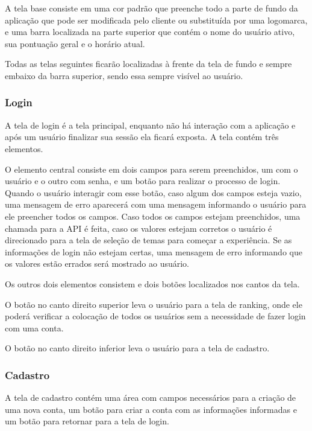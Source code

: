 A tela base consiste em uma cor padrão que preenche todo a parte de fundo da aplicação que pode ser modificada pelo cliente ou substituída por uma logomarca, e uma barra localizada na parte superior que contém o nome do usuário ativo, sua pontuação geral e o horário atual.

Todas as telas seguintes ficarão localizadas à frente da tela de fundo e sempre embaixo da barra superior, sendo essa sempre visível ao usuário.

\subsubsection{Login}
\label{subsubsec:login}

A tela de login é a tela principal, enquanto não há interação com a aplicação e após um usuário finalizar sua sessão ela ficará exposta. A tela contém três elementos.
    
O elemento central consiste em dois campos para serem preenchidos, um com o usuário e o outro com senha, e um botão para realizar o processo de login. Quando o usuário interagir com esse botão, caso algum dos campos esteja vazio, uma mensagem de erro aparecerá com uma mensagem informando o usuário para ele preencher todos os campos. Caso todos os campos estejam preenchidos, uma chamada para a API é feita, caso os valores estejam corretos o usuário é direcionado para a tela de seleção de temas para começar a experiência. Se as informações de login não estejam certas, uma mensagem de erro informando que os valores estão errados será mostrado ao usuário.

Os outros dois elementos consistem e dois botões localizados nos cantos da tela.
    
O botão no canto direito superior leva o usuário para a tela de ranking, onde ele poderá verificar a colocação de todos os usuários sem a necessidade de fazer login com uma conta.
    
O botão no canto direito inferior leva o usuário para a tela de cadastro.

\subsubsection{Cadastro}
\label{subsubsec:cadastro}

A tela de cadastro contém uma área com campos necessários para a criação de uma nova conta, um botão para criar a conta com as informações informadas e um botão para retornar para a tela de login.


